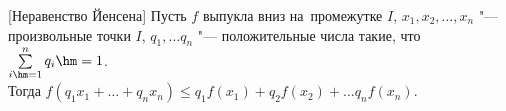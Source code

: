 [Неравенство Йенсена]
    Пусть $f$ выпукла вниз на~промежутке $I$, $x_1,x_2,\ldots,x_n$ "--- произвольные точки $I$, $q_1,\ldots q_n$ "--- положительные числа такие, что
    $\sum\limits_{i\hm=1}^nq_i\hm=1$. \\Тогда $f(q_1x_1+\ldots+q_nx_n)\leq q_1f(x_1)+q_2f(x_2)+\ldots q_nf(x_n)$.
